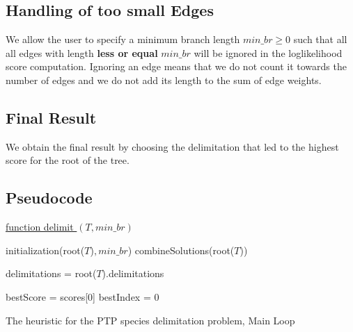 \documentclass{llncs}
\begin{document}
\subsection{Handling of too small Edges}

We allow the user to specify a minimum branch length $min\_br \geq 0$ such that all all edges with length \textbf{less or equal} $min\_br$ will be ignored in the loglikelihood score computation. Ignoring an edge means that we do not count it towards the number of edges and we do not add its length to the sum of edge weights.

\subsection{Final Result}
We obtain the final result by choosing the delimitation that led to the highest score for the root of the tree.

\subsection{Pseudocode}
\begin{algorithm}


\underline{function delimit $(T, min\_br)$}\

initialization(root($T$)$, min\_br$)\;
combineSolutions(root($T$))\;

delimitations = root($T$).delimitations\;

bestScore = scores[0]\;
bestIndex = 0\;


\caption{The heuristic for the PTP species delimitation problem, Main Loop}

\end{algorithm}
\end{document}

